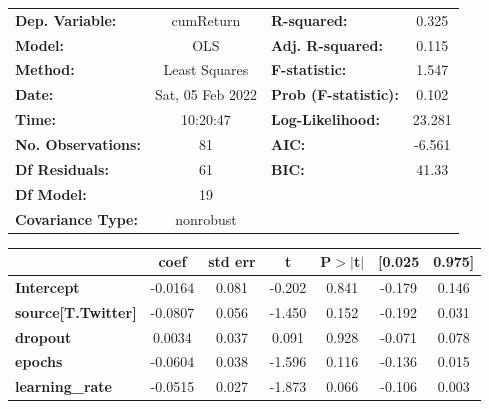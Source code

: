 \begin{center}
\begin{tabular}{lclc}
\toprule
\textbf{Dep. Variable:}                   &    cumReturn     & \textbf{  R-squared:         } &     0.325   \\
\textbf{Model:}                           &       OLS        & \textbf{  Adj. R-squared:    } &     0.115   \\
\textbf{Method:}                          &  Least Squares   & \textbf{  F-statistic:       } &     1.547   \\
\textbf{Date:}                            & Sat, 05 Feb 2022 & \textbf{  Prob (F-statistic):} &    0.102    \\
\textbf{Time:}                            &     10:20:47     & \textbf{  Log-Likelihood:    } &    23.281   \\
\textbf{No. Observations:}                &          81      & \textbf{  AIC:               } &    -6.561   \\
\textbf{Df Residuals:}                    &          61      & \textbf{  BIC:               } &     41.33   \\
\textbf{Df Model:}                        &          19      & \textbf{                     } &             \\
\textbf{Covariance Type:}                 &    nonrobust     & \textbf{                     } &             \\
\bottomrule
\end{tabular}
\begin{tabular}{lcccccc}
                                          & \textbf{coef} & \textbf{std err} & \textbf{t} & \textbf{P$> |$t$|$} & \textbf{[0.025} & \textbf{0.975]}  \\
\midrule
\textbf{Intercept}                        &      -0.0164  &        0.081     &    -0.202  &         0.841        &       -0.179    &        0.146     \\
\textbf{source[T.Twitter]}                &      -0.0807  &        0.056     &    -1.450  &         0.152        &       -0.192    &        0.031     \\
\textbf{dropout}                          &       0.0034  &        0.037     &     0.091  &         0.928        &       -0.071    &        0.078     \\
\textbf{epochs}                           &      -0.0604  &        0.038     &    -1.596  &         0.116        &       -0.136    &        0.015     \\
\textbf{learning\_rate}                   &      -0.0515  &        0.027     &    -1.873  &         0.066        &       -0.106    &        0.003     \\

\end{tabular}
\end{center}
